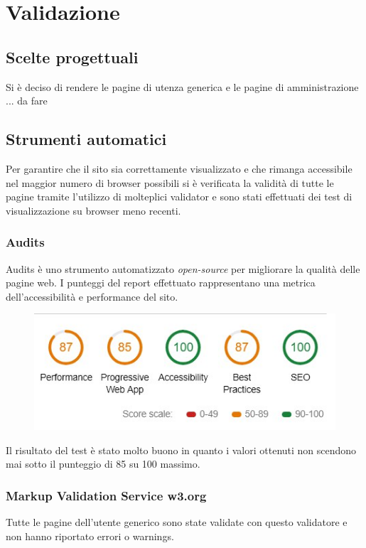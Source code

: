 
\section{Validazione}

\subsection{Scelte progettuali}
Si è deciso di rendere le pagine di utenza generica e le pagine di amministrazione ... da fare 

\subsection{Strumenti automatici}
Per garantire che il sito sia correttamente visualizzato e che rimanga accessibile nel maggior numero di browser possibili si è verificata la validità di tutte le pagine tramite l'utilizzo di molteplici validator e sono stati effettuati dei test di visualizzazione su browser meno recenti.

\subsubsection{Audits}
Audits è uno strumento automatizzato \textit{open-source} per migliorare la qualità delle pagine web.
I punteggi del report effettuato rappresentano una metrica dell'accessibilità e performance del sito.
\begin{figure}[H]
	\centerline{\includegraphics[scale= 0.65]{img/punteggiAudits.jpg}}
\end{figure}
Il risultato del test è stato molto buono in quanto i valori ottenuti non scendono mai sotto il punteggio di 85 su 100 massimo. 

\subsubsection{Markup Validation Service w3.org}
Tutte le pagine dell'utente generico sono state validate con questo validatore e non hanno riportato errori o warnings.


